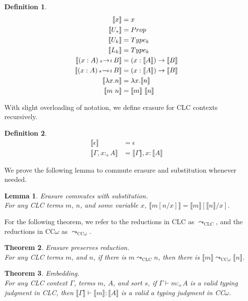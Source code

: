 \documentclass{article}
\newtheorem{theorem}{Theorem}[section]
\newtheorem{lemma}[theorem]{Lemma}
\theoremstyle{definition}
\newtheorem{definition}{Definition}[section]
\newcommand{\stype}[1]{:_#1}
\newcommand{\pstep}{\leadsto}
\newcommand{\arw}[2]
{\hspace*{0.2em}{\scriptstyle #1}\hspace*{-0.2em}
\rightarrow
\hspace*{-0.2em}{\scriptstyle #2}\hspace*{0.2em}}
\newcommand{\lrw}[2]
{\hspace*{0.2em}{\scriptstyle #1}\hspace*{-0.2em}
\multimap
\hspace*{-0.2em}{\scriptstyle #2}\hspace*{0.2em}}
\newcommand{\erase}[1]{\llbracket #1 \rrbracket}
\begin{document}
  \begin{definition}
    \begin{align*}
      \erase{x} &= x \\
      \erase{U_*} &= Prop \\
      \erase{U_k} &= Type_k \\
      \erase{L_k} &= Type_k \\
      \erase{(x : A) \arw{s}{t} B} &= (x : \erase{A}) \rightarrow \erase{B} \\
      \erase{(x : A) \lrw{s}{t} B} &= (x : \erase{A}) \rightarrow \erase{B} \\
      \erase{\lambda x.n} &= \lambda x.\erase{n} \\
      \erase{m\ n} &= \erase{m}\ \erase{n}
    \end{align*}
  \end{definition}

  With slight overloading of notation, we define erasure for CLC contexts recursively.

  \begin{definition}
    \begin{align*}
      \erase{\epsilon} &= \epsilon \\
      \erase{\Gamma, x \stype{s} A} &= \erase{\Gamma}, x : \erase{A}
    \end{align*}
  \end{definition}

  We prove the following lemma to commute erasure and substitution whenever needed.
  \begin{lemma} Erasure commutes with substitution. \\ 
    For any CLC terms $m$, $n$, and some variable $x$, $\erase{m[n/x]} = \erase{m}[\erase{n}/x]$. 
  \end{lemma}

  For the following theorem, we refer to the reductions in CLC as $\pstep_{\scriptscriptstyle \text{CLC}}$, and the reductions in CC$\omega$ as $\pstep_{\scriptscriptstyle \text{CC$\omega$}}$.
  \begin{theorem} \label{preserve} Erasure preserves reduction. \\
    For any CLC terms $m$, and $n$, if there is $m \pstep_{\scriptscriptstyle \text{CLC}} n$, then there is $\erase{m} \pstep_{\scriptscriptstyle \text{CC$\omega$}} \erase{n}$.
  \end{theorem}

  \begin{theorem} \label{embedding} Embedding. \\
    For any CLC context $\Gamma$, terms $m$, $A$, and sort $s$, if $\Gamma \vdash m \stype{s} A$ is a valid typing judgment in CLC, then $\erase{\Gamma} \vdash \erase{m} : \erase{A}$ is a valid a typing judgment in CC$\omega$.
  \end{theorem}
\end{document}
